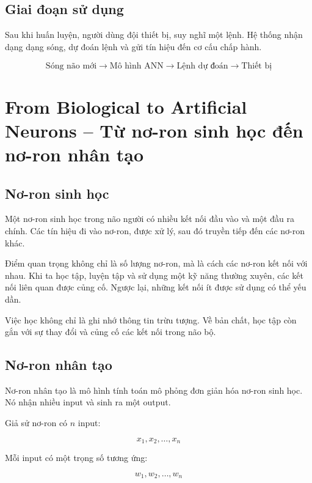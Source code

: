 \subsection{Giai đoạn sử dụng}

Sau khi huấn luyện, người dùng đội thiết bị, suy nghĩ một lệnh. Hệ thống nhận dạng dạng sóng, dự đoán lệnh và gửi tín hiệu đến cơ cấu chấp hành.

\[
    \text{Sóng não mới} \rightarrow \text{Mô hình ANN} \rightarrow \text{Lệnh dự đoán} \rightarrow \text{Thiết bị}
\]

\section{From Biological to Artificial Neurons -- Từ nơ-ron sinh học đến nơ-ron nhân tạo}

\subsection{Nơ-ron sinh học}

Một nơ-ron sinh học trong não người có nhiều kết nối đầu vào và một đầu ra chính. Các tín hiệu đi vào nơ-ron, được xử lý, sau đó truyền tiếp đến các nơ-ron khác.

Điểm quan trọng không chỉ là số lượng nơ-ron, mà là cách các nơ-ron kết nối với nhau. Khi ta học tập, luyện tập và sử dụng một kỹ năng thường xuyên, các kết nối liên quan được củng cố. Ngược lại, những kết nối ít được sử dụng có thể yếu dần.

\begin{ghinho}
Việc học không chỉ là ghi nhớ thông tin trừu tượng. Về bản chất, học tập còn gắn với sự thay đổi và củng cố các kết nối trong não bộ.
\end{ghinho}

\subsection{Nơ-ron nhân tạo}

Nơ-ron nhân tạo là mô hình tính toán mô phỏng đơn giản hóa nơ-ron sinh học. Nó nhận nhiều input và sinh ra một output.

Giả sử nơ-ron có $n$ input:

\[
    x_1, x_2, \ldots, x_n
\]

Mỗi input có một trọng số tương ứng:

\[
    w_1, w_2, \ldots, w_n
\]

